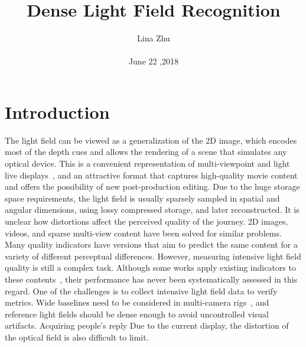 \documentclass[10pt,twocolumn,letterpaper]{article}
\begin{document}
\title{Dense Light Field Recognition}
\author{Lina Zhu\\\\June 22 ,2018}
\maketitle
\section{Introduction}
The light field can be viewed as a generalization of the 2D image, which encodes most of the depth cues and allows the rendering of a scene that simulates any optical device. This is a convenient representation of multi-viewpoint and light live displays~\cite{Wetzstein_2012_Tensor}, and an attractive format that captures high-quality movie content and offers the possibility of new post-production editing. Due to the huge storage space requirements, the light field is usually sparsely sampled in spatial and angular dimensions, using lossy compressed storage, and later reconstructed. It is unclear how distortions affect the perceived quality of the journey. 2D images, videos, and sparse multi-view content have been solved for similar problems. Many quality indicators have versions that aim to predict the same content for a variety of different perceptual differences. However, measuring intensive light field quality is still a complex task. Although some works apply existing indicators to these contents~\cite{Dansereau_2013_Light}, their performance has never been systematically assessed in this regard. One of the challenges is to collect intensive light field data to verify metrics. Wide baselines need to be considered in multi-camera rigs~\cite{Wilburn_2005_High}, and reference light fields should be dense enough to avoid uncontrolled visual artifacts. Acquiring people's reply Due to the current display, the distortion of the optical field is also difficult to limit.
\end{document}
